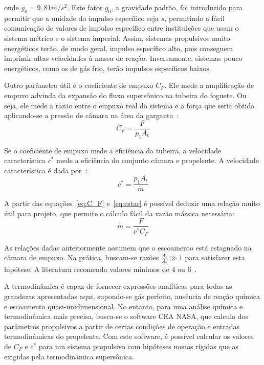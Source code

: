 onde \(g_0=9,81m/s^2\). Este fator \(g_0\), a gravidade padrão, foi introduzido para permitir que a unidade do impulso específico seja \(s\), permitindo a fácil comunicação de valores de impulso específico entre instituições que usam o sistema métrico e o sistema imperial. Assim, sistemas propulsivos muito energéticos terão, de modo geral, impulso específico alto, pois conseguem imprimir altas velocidades à massa de reação. Inversamente, sistemas pouco energéticos, como os de gás frio, terão impulsos específicos baixos.

Outro parâmetro útil é o coeficiente de empuxo \(C_F\). Ele mede a amplificação de empuxo advinda da expansão do fluxo supersônico na tubeira do foguete. Ou seja, ele mede a razão entre o empuxo real do sistema e a força que seria obtida aplicando-se a pressão de câmara na área da garganta~\cite{Sutton}:
\begin{equation}
    \label{eq:C_F}
    C_F = \frac{F}{p_1 A_t}
\end{equation}

Se o coeficiente de empuxo mede a eficiência da tubeira, a velocidade característica \(c^*\) mede a eficiência do conjunto câmara e propelente. A velocidade característica é dada por~\cite{Sutton}:
\begin{equation}
    \label{eq:cstar}
    c^* = \frac{p_1 A_t}{\dot{m}}
\end{equation}

A partir das equações~\ref{eq:C_F} e~\ref{eq:cstar} é possível deduzir uma relação muito útil para projeto, que permite o cálculo fácil da vazão mássica necessária:
\begin{equation}
    \label{eq:mdot}
    \dot{m} = \frac{F}{c^* C_F}
\end{equation}

As relações dadas anteriormente assumem que o escoamento está estagnado na câmara de empuxo. Na prática, buscam-se razões \(\frac{A_c}{A_t} \gg 1\) para satisfazer esta hipótese. A literatura recomenda valores mínimos de 4 ou 6~\cite{Sutton}.

A termodinâmica é capaz de fornecer expressões analíticas para todas as grandezas apresentadas aqui, supondo-se gás perfeito, ausência de reação química e escoamento quasi-unidimensional. No entanto, para uma análise química e termodinâmica mais precisa, busca-se o software CEA NASA, que calcula dos parâmetros propulsivos a partir de certas condições de operação e entradas termodinâmicas do propelente. Com este software, é possível calcular os valores de \(C_F\) e \(c^*\) para um sistema propulsivo com hipóteses menos rígidas que as exigidas pela termodinâmica supersônica. 